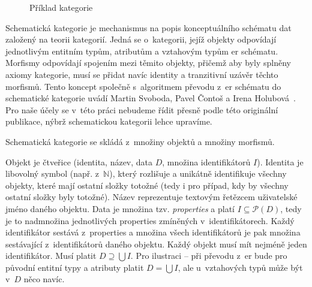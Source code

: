 \begin{figure}[!htb]
  \centering
\caption{Příklad kategorie}%
  \label{fig:category-example}%
\end{figure}

Schematická kategorie je mechanismus na popis konceptuálního schématu dat založený na teorii kategorií.
Jedná se o~kategorii, jejíž objekty odpovídají jednotlivým entitním typům, atributům a vztahovým typům \acrshort{er} schématu.
Morfismy odpovídají spojením mezi těmito objekty, přičemž aby byly splněny axiomy kategorie, musí se přidat navíc identity a tranzitivní uzávěr těchto morfismů.
Tento koncept společně s~algoritmem převodu z~\acrshort{er} schématu do schematické kategorie uvádí Martin Svoboda, Pavel Čontoš a Irena Holubová~\cite{svoboda_categorical_2021}.
Pro naše účely se v~této práci nebudeme řídit přesně podle této originální publikace, nýbrž schematickou kategorii lehce upravíme.

Schematická kategorie se skládá z~množiny objektů a množiny morfismů.

Objekt je čtveřice (identita, název, data $D$, množina identifikátorů $I$).
Identita je libovolný symbol (např. z~$\mathbb N$), který rozlišuje a unikátně identifikuje všechny objekty, které mají ostatní složky totožné (tedy i pro případ, kdy by všechny ostatní složky byly totožné).
Název reprezentuje textovým řetězcem uživatelské jméno daného objektu.
Data je množina tzv. \emph{properties} a platí $I\subseteq \mathcal P(D)$, tedy je to nadmnožina jednotlivých properties zmíněných v~identifikátorech.
Každý identifikátor sestává z~properties a množina všech identifikátorů je pak množina sestávající z~identifikátorů daného objektu.
Každý objekt musí mít nejméně jeden identifikátor.
Musí platit $D\supseteq \bigcup I$.
Pro ilustraci -- při převodu z~\acrshort{er} bude pro původní entitní typy a atributy platit $D = \bigcup I$, ale u~vztahových typů může být v~$D$ něco navíc.

